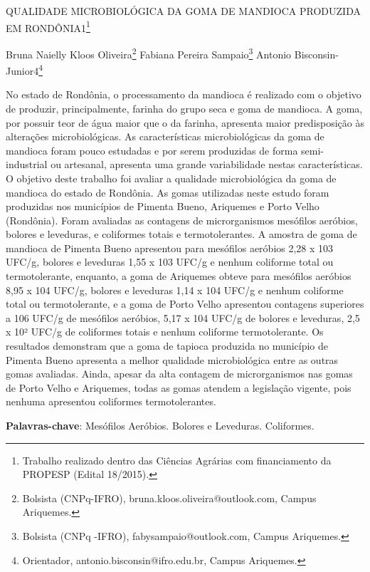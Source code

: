 \documentclass[article,12pt,onesidea,4paper,english,brazil]{abntex2}
\begin{document}
	
	
	\frenchspacing 
	
	\begin{center}
		\LARGE QUALIDADE MICROBIOLÓGICA DA GOMA DE MANDIOCA PRODUZIDA EM RONDÔNIA1\footnote{Trabalho realizado dentro das Ciências Agrárias com financiamento da PROPESP (Edital 18/2015).}
		
		\normalsize
		Bruna Naielly Kloos Oliveira\footnote{Bolsista (CNPq-IFRO), bruna.kloos.oliveira@outlook.com, Campus Ariquemes.} 
	Fabiana Pereira Sampaio\footnote{Bolsista (CNPq -IFRO), fabysampaio@outlook.com, Campus Ariquemes.} 
	Antonio Bisconsin-Junior4\footnote{Orientador, antonio.bisconsin@ifro.edu.br, Campus Ariquemes.}
	\end{center}
	
	\noindent No estado de Rondônia, o processamento da mandioca é realizado com o objetivo de produzir, principalmente, farinha do grupo seca e goma de mandioca. A goma, por possuir teor de água maior que o da farinha, apresenta maior predisposição às alterações microbiológicas. As características microbiológicas da goma de mandioca foram pouco estudadas e por serem produzidas de forma semi-industrial ou artesanal, apresenta uma grande variabilidade nestas características. O objetivo deste trabalho foi avaliar a qualidade microbiológica da goma de mandioca do estado de Rondônia. As gomas utilizadas neste estudo foram produzidas nos municípios de Pimenta Bueno, Ariquemes e Porto Velho (Rondônia). Foram avaliadas as contagens de microrganismos mesófilos aeróbios, bolores e leveduras, e coliformes totais e termotolerantes. A amostra de goma de mandioca de Pimenta Bueno apresentou para mesófilos aeróbios 2,28 x 103 UFC/g, bolores e leveduras 1,55 x 103 UFC/g e nenhum coliforme total ou termotolerante, enquanto, a goma de Ariquemes obteve para mesófilos aeróbios 8,95 x 104 UFC/g, bolores e leveduras 1,14 x 104 UFC/g e nenhum coliforme total ou termotolerante, e a goma de Porto Velho apresentou contagens superiores a 106 UFC/g de mesófilos aeróbios, 5,17 x 104 UFC/g de bolores e leveduras, 2,5 x 10² UFC/g de coliformes totais e nenhum coliforme termotolerante. Os resultados demonstram que a goma de tapioca produzida no município de Pimenta Bueno apresenta a melhor qualidade microbiológica entre as outras gomas avaliadas. Ainda, apesar da alta contagem de microrganismos nas gomas de Porto Velho e Ariquemes, todas as gomas atendem a legislação vigente, pois nenhuma apresentou coliformes termotolerantes.
	
	\vspace{\onelineskip}
	
	\noindent
	\textbf{Palavras-chave}: Mesófilos Aeróbios. Bolores e Leveduras. Coliformes.
	
\end{document}
